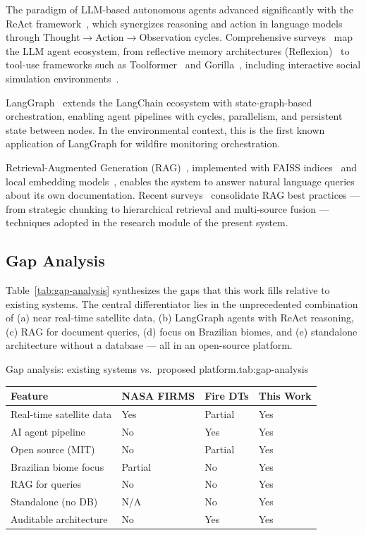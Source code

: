 \documentclass[preprint,12pt,times,numbers]{elsarticle}
\begin{document}
The paradigm of LLM-based autonomous agents advanced significantly with the ReAct framework~\cite{article:react2023}, which synergizes reasoning and action in language models through Thought$\rightarrow$Action$\rightarrow$Observation cycles. Comprehensive surveys~\cite{article:xi2023,article:wang2024survey} map the LLM agent ecosystem, from reflective memory architectures (Reflexion)~\cite{article:shinn2023} to tool-use frameworks such as Toolformer~\cite{article:schick2023} and Gorilla~\cite{article:patil2023}, including interactive social simulation environments~\cite{article:park2023}.

LangGraph~\cite{manual:langgraph2024} extends the LangChain ecosystem with state-graph-based orchestration, enabling agent pipelines with cycles, parallelism, and persistent state between nodes. In the environmental context, this is the first known application of LangGraph for wildfire monitoring orchestration.

Retrieval-Augmented Generation (RAG)~\cite{article:lewis2020}, implemented with FAISS indices~\cite{article:faiss2017} and local embedding models~\cite{model:bge2024}, enables the system to answer natural language queries about its own documentation. Recent surveys~\cite{article:gao2024rag} consolidate RAG best practices --- from strategic chunking to hierarchical retrieval and multi-source fusion --- techniques adopted in the research module of the present system.

\subsection{Gap Analysis}

Table~\ref{tab:gap-analysis} synthesizes the gaps that this work fills relative to existing systems. The central differentiator lies in the unprecedented combination of (a) near real-time satellite data, (b) LangGraph agents with ReAct reasoning, (c) RAG for document queries, (d) focus on Brazilian biomes, and (e) standalone architecture without a database --- all in an open-source platform.

\begin{resulttable}{Gap analysis: existing systems vs.\ proposed platform.}{tab:gap-analysis}
\begin{tabular}{@{}lp{2.0cm}p{1.6cm}p{1.6cm}@{}}
\toprule
\textbf{Feature} & \textbf{NASA FIRMS} & \textbf{Fire DTs} & \textbf{This Work} \\
\midrule
Real-time satellite data & Yes & Partial & Yes \\
AI agent pipeline & No & Yes & Yes \\
Open source (MIT) & No & Partial & Yes \\
Brazilian biome focus & Partial & No & Yes \\
RAG for queries & No & No & Yes \\
Standalone (no DB) & N/A & No & Yes \\
Auditable architecture & No & Yes & Yes \\
\bottomrule
\end{tabular}
\end{resulttable}
\end{document}
